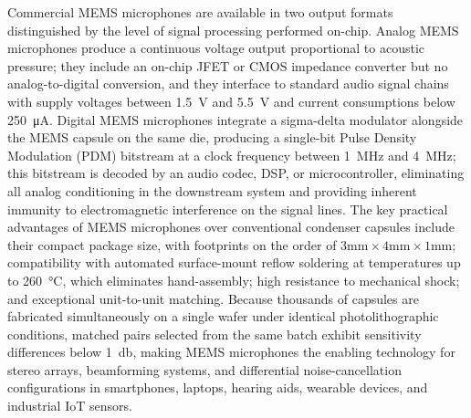 Commercial MEMS microphones are available in two output formats distinguished by the level of signal processing performed on-chip.
Analog MEMS microphones produce a continuous voltage output proportional to acoustic pressure; they include an on-chip JFET or CMOS impedance converter but no analog-to-digital conversion, and they interface to standard audio signal chains with supply voltages between \SI{1.5}{\volt} and \SI{5.5}{\volt} and current consumptions below \SI{250}{\micro\ampere}.
Digital MEMS microphones integrate a sigma-delta modulator alongside the MEMS capsule on the same die, producing a single-bit Pulse Density Modulation (PDM) bitstream at a clock frequency between \SI{1}{\mega\hertz} and \SI{4}{\mega\hertz}; this bitstream is decoded by an audio codec, DSP, or microcontroller, eliminating all analog conditioning in the downstream system and providing inherent immunity to electromagnetic interference on the signal lines.
The key practical advantages of MEMS microphones over conventional condenser capsules include their compact package size, with footprints on the order of \( 3\mathrm{mm} \times 4\mathrm{mm} \times 1\mathrm{mm} \); compatibility with automated surface-mount reflow soldering at temperatures up to \SI{260}{\degreeCelsius}, which eliminates hand-assembly; high resistance to mechanical shock; and exceptional unit-to-unit matching.
Because thousands of capsules are fabricated simultaneously on a single wafer under identical photolithographic conditions, matched pairs selected from the same batch exhibit sensitivity differences below \SI{1}{\decibel}, making MEMS microphones the enabling technology for stereo arrays, beamforming systems, and differential noise-cancellation configurations in smartphones, laptops, hearing aids, wearable devices, and industrial IoT sensors.

